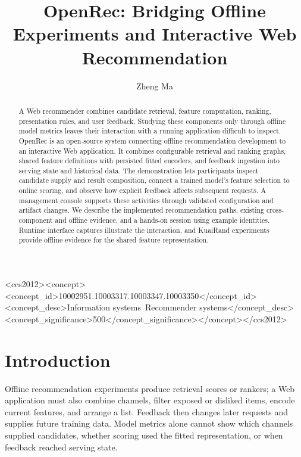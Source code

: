 \documentclass[sigconf,screen,review]{acmart}
\begin{document}
\title{OpenRec: Bridging Offline Experiments and Interactive Web Recommendation}
\author{Zheng Ma}
\renewcommand{\shortauthors}{Zheng Ma}

\begin{abstract}
A Web recommender combines candidate retrieval, feature computation, ranking, presentation rules, and user feedback. Studying these components only through offline model metrics leaves their interaction with a running application difficult to inspect. OpenRec is an open-source system connecting offline recommendation development to an interactive Web application. It combines configurable retrieval and ranking graphs, shared feature definitions with persisted fitted encoders, and feedback ingestion into serving state and historical data. The demonstration lets participants inspect candidate supply and result composition, connect a trained model's feature selection to online scoring, and observe how explicit feedback affects subsequent requests. A management console supports these activities through validated configuration and artifact changes. We describe the implemented recommendation paths, existing cross-component and offline evidence, and a hands-on session using example identities. Runtime interface captures illustrate the interaction, and KuaiRand experiments provide offline evidence for the shared feature representation.
\end{abstract}

\begin{CCSXML}
<ccs2012><concept><concept_id>10002951.10003317.10003347.10003350</concept_id><concept_desc>Information systems~Recommender systems</concept_desc><concept_significance>500</concept_significance></concept></ccs2012>
\end{CCSXML}
\maketitle

\section{Introduction}
Offline recommendation experiments produce retrieval scores or rankers; a Web application must also combine channels, filter exposed or disliked items, encode current features, and arrange a list. Feedback then changes later requests and supplies future training data. Model metrics alone cannot show which channels supplied candidates, whether scoring used the fitted representation, or when feedback reached serving state.
\end{document}

